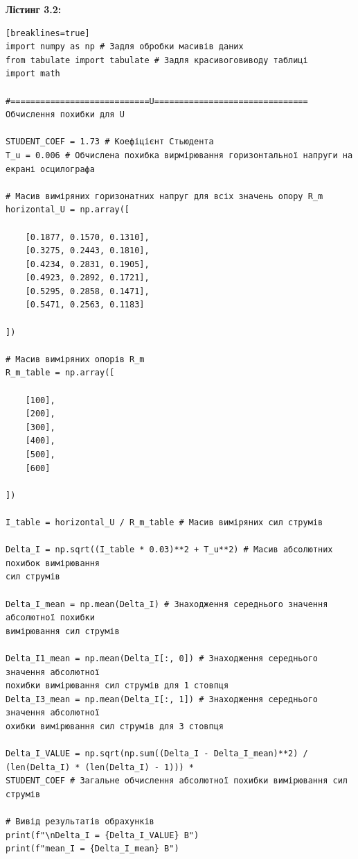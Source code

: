 \documentclass[12pt,a4paper]{article}
\begin{document}
    \vspace{3em}

    \hypertarget{listing2}{}

    \textbf{\large Лістинг 3.2:}

    \vspace{1em}

    \small{

    \begin{verbatim}[breaklines=true]
import numpy as np # Задля обробки масивів даних
from tabulate import tabulate # Задля красивоговиводу таблиці
import math

#============================U===============================
Обчислення похибки для U

STUDENT_COEF = 1.73 # Коефіцієнт Стьюдента
T_u = 0.006 # Обчислена похибка вирмірювання горизонтальної напруги на екрані осцилографа

# Масив виміряних горизонатних напруг для всіх значень опору R_m
horizontal_U = np.array([

    [0.1877, 0.1570, 0.1310],
    [0.3275, 0.2443, 0.1810],
    [0.4234, 0.2831, 0.1905],
    [0.4923, 0.2892, 0.1721],
    [0.5295, 0.2858, 0.1471],
    [0.5471, 0.2563, 0.1183]

])

# Масив виміряних опорів R_m
R_m_table = np.array([

    [100],
    [200],
    [300],
    [400],
    [500],
    [600]

])

I_table = horizontal_U / R_m_table # Масив виміряних сил струмів

Delta_I = np.sqrt((I_table * 0.03)**2 + T_u**2) # Масив абсолютних похибок вимірювання
сил струмів

Delta_I_mean = np.mean(Delta_I) # Знаходження середнього значення абсолютної похибки
вимірювання сил струмів

Delta_I1_mean = np.mean(Delta_I[:, 0]) # Знаходження середнього значення абсолютної
похибки вимірювання сил струмів для 1 стовпця
Delta_I3_mean = np.mean(Delta_I[:, 1]) # Знаходження середнього значення абсолютної 
охибки вимірювання сил струмів для 3 стовпця

Delta_I_VALUE = np.sqrt(np.sum((Delta_I - Delta_I_mean)**2) /
(len(Delta_I) * (len(Delta_I) - 1))) *
STUDENT_COEF # Загальне обчислення абсолютної похибки вимірювання сил струмів

# Вивід результатів обрахунків
print(f"\nDelta_I = {Delta_I_VALUE} В")
print(f"mean_I = {Delta_I_mean} В")


\end{verbatim}}
\end{document}
